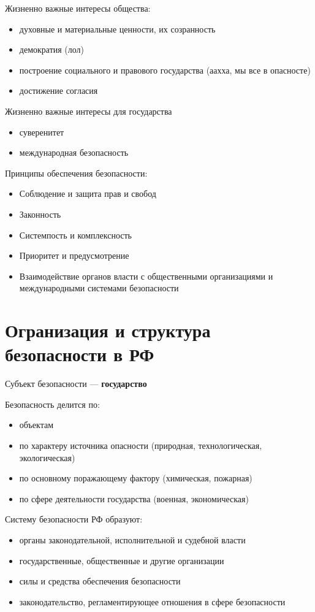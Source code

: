 \documentclass[oneside,final,14pt]{extreport}
\begin{document}
Жизненно важные интересы общества:
\begin{itemize}
	\item духовные и материальные ценности, их созранность
	\item демократия (лол)
	\item построение социального и правового государства (аахха, мы все в опасносте)
	\item достижение согласия
\end{itemize}

Жизненно важные интересы для государства
\begin{itemize}
	\item суверенитет
	\item международная безопасность
\end{itemize}

Принципы обеспечения безопасности:
\begin{itemize}
	\item Соблюдение и защита прав и свобод
	\item Законность
	\item Системпость и комплексность
	\item Приоритет и предусмотрение
	\item Взаимодействие органов власти с общественными организациями и международными системами безопасности
\end{itemize}

\section*{Огранизация и структура безопасности в РФ}
Субъект безопасности --- \textbf{государство}

Безопасность делится по:
\begin{itemize}
	\item объектам
	\item по характеру источника опасности (природная, технологическая, экологическая)
	\item по основному поражающему фактору (химическая, пожарная)
	\item по сфере деятельности государства (военная, экономическая)
\end{itemize}

Систему безопасности РФ образуют:
\begin{itemize}
	\item органы законодательной, исполнительной и судебной власти
	\item государственные, общественные и другие организации
	\item силы и средства обеспечения безопасности
	\item законодательство, регламентирующее отношения в сфере безопасности
\end{itemize}
\end{document}
